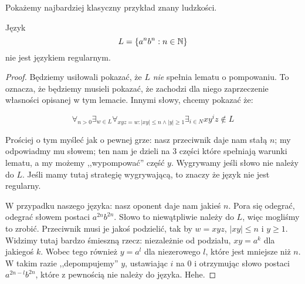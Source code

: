 Pokażemy najbardziej klasyczny przykład znany ludzkości.

\begin{theorem}
	Język
	\[
		L = \set{a^nb^n : n \in \natural}
	\]
	nie jest językiem regularnym.
\end{theorem}

\begin{proof}
	Będziemy usiłowali pokazać, że \(L\) \textit{nie} spełnia lematu o pompowaniu. To oznacza, że będziemy musieli pokazać, że zachodzi dla niego zaprzeczenie własności opisanej w tym lemacie. Innymi słowy, chcemy pokazać że:

	\[
		\forall_{n>0} \exists_{w \in L} \forall_{xyz=w : |xy| \leq n \land |y| \geq 1} \exists_{i \in N} xy^iz \not \in L
	\]

	Prościej o tym myśleć jak o pewnej grze: nasz przeciwnik daje nam stałą \(n\); my odpowiadmy mu słowem; ten nam je dzieli na 3 części które spełniają warunki lematu, a my możemy ,,wypompować'' część \(y\). Wygrywamy jeśli słowo nie należy do \(L\). Jeśli mamy tutaj strategię wygrywającą, to znaczy że język nie jest regularny.

	W przypadku naszego języka: nasz oponent daje nam jakieś \(n\). Pora się odegrać, odegrać słowem postaci \(a^{2n}b^{2n}\). Słowo to niewątpliwie należy do \(L\), więc mogliśmy to zrobić. Przeciwnik musi je jakoś podzielić, tak by \( w = xyz\), \(|xy| \leq n \) i \(y \geq 1\). Widzimy tutaj bardzo śmieszną rzecz: niezależnie od podziału, \(xy = a^k\) dla jakiegoś \(k\). Wobec tego również \(y = a^l\) dla niezerowego \(l\), które jest mniejsze niż \(n\). W takim razie ,,depompujemy'' \(y\), ustawiając \(i\) na 0 i otrzymując słowo postaci \(a^{2n-l}b^{2n}\), które z pewnością nie należy do języka. Hehe.
\end{proof}